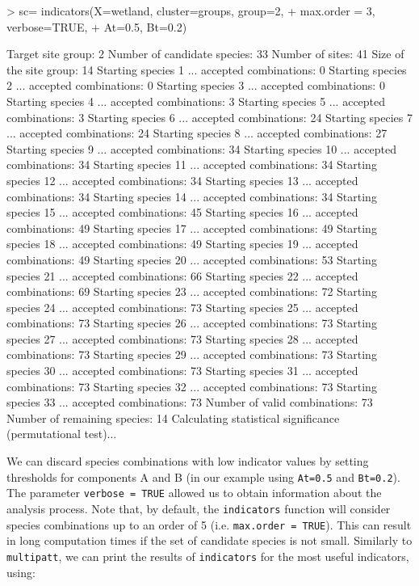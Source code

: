 \documentclass[11pt,a4paper]{article}
\begin{document}
\begin{Schunk}
\begin{Sinput}
> sc= indicators(X=wetland, cluster=groups, group=2, 
+                max.order = 3, verbose=TRUE, 
+                At=0.5, Bt=0.2)
\end{Sinput}
\begin{Soutput}
Target site group: 2
Number of candidate species: 33
Number of sites: 41 
Size of the site group: 14 
Starting species  1 ... accepted combinations: 0 
Starting species  2 ... accepted combinations: 0 
Starting species  3 ... accepted combinations: 0 
Starting species  4 ... accepted combinations: 3 
Starting species  5 ... accepted combinations: 3 
Starting species  6 ... accepted combinations: 24 
Starting species  7 ... accepted combinations: 24 
Starting species  8 ... accepted combinations: 27 
Starting species  9 ... accepted combinations: 34 
Starting species  10 ... accepted combinations: 34 
Starting species  11 ... accepted combinations: 34 
Starting species  12 ... accepted combinations: 34 
Starting species  13 ... accepted combinations: 34 
Starting species  14 ... accepted combinations: 34 
Starting species  15 ... accepted combinations: 45 
Starting species  16 ... accepted combinations: 49 
Starting species  17 ... accepted combinations: 49 
Starting species  18 ... accepted combinations: 49 
Starting species  19 ... accepted combinations: 49 
Starting species  20 ... accepted combinations: 53 
Starting species  21 ... accepted combinations: 66 
Starting species  22 ... accepted combinations: 69 
Starting species  23 ... accepted combinations: 72 
Starting species  24 ... accepted combinations: 73 
Starting species  25 ... accepted combinations: 73 
Starting species  26 ... accepted combinations: 73 
Starting species  27 ... accepted combinations: 73 
Starting species  28 ... accepted combinations: 73 
Starting species  29 ... accepted combinations: 73 
Starting species  30 ... accepted combinations: 73 
Starting species  31 ... accepted combinations: 73 
Starting species  32 ... accepted combinations: 73 
Starting species  33 ... accepted combinations: 73 
Number of valid combinations: 73
Number of remaining species: 14 
Calculating statistical significance (permutational test)...
\end{Soutput}
\end{Schunk}
We can discard species combinations with low indicator values by setting thresholds for components A and B (in our example using  \texttt{At=0.5} and \texttt{Bt=0.2}). The parameter \texttt{verbose = TRUE} allowed us to obtain information about the analysis process. Note that, by default, the \texttt{indicators} function will consider species combinations up to an order of 5 (i.e. \texttt{max.order = TRUE}). This can result in long computation times if the set of candidate species is not small. Similarly to \texttt{multipatt}, we can print the results of \texttt{indicators} for the most useful indicators, using:
\end{document}
